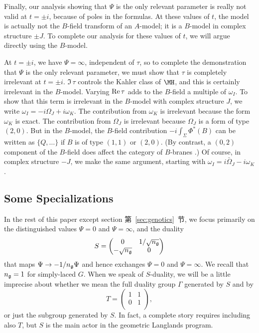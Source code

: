 Finally, our analysis showing that $\Psi$ is the only relevant
parameter is really not valid at $t=\pm i$, because of poles in
the formulas.  At these values of $t$, the model is actually not
the $B$-field transform of an $A$-model; it is a $B$-model in
complex structure $\pm J$. To complete our analysis for these
values of $t$, we will argue directly using the $B$-model.

At $t=\pm i$, we have $\Psi=\infty$, independent of $\tau$, so to
complete the demonstration that $\Psi$ is the only relevant
parameter, we must show that $\tau$ is completely irrelevant at
$t=\pm i$. ${\Im}\,\tau$ controls the Kahler class of $\MH$, and
this is certainly irrelevant in the $B$-model.  Varying ${\rm
Re}\,\tau$ adds to the $B$-field a multiple of $\omega_I$. To show
that this term is irrelevant in the $B$-model with complex
structure $J$, we write $\omega_I=-i\Omega_J+i\omega_K$. The
contribution from $\omega_K$ is irrelevant because the form
$\omega_K$ is exact. The contribution from $\Omega_J$ is
irrelevant because $\Omega_J$ is a form of type $(2,0)$.  But in
the $B$-model, the $B$-field contribution $-i\int_\Sigma\Phi^*(B)$
can be written as $\{Q,\dots\}$ if $B$ is of type $(1,1)$ or
$(2,0)$.  (By contrast, a $(0,2)$ component of the $B$-field does
affect the category of $B$-branes \cite{ref71}.) Of course, in complex
structure $-J$, we make the same argument, starting with
$\omega_I=i\bar\Omega_J-i\omega_K$.

\subsection{Some Specializations}

\label{sec:somespec}

In the rest of this paper except section 第~\ref{sec:genotics}~节, we focus
primarily on the distinguished values $\Psi=0$ and $\Psi=\infty$,
and the duality %
\setcounter{equation}{34}
\begin{equation}\label{eq:rtu}
S=\left(\begin{matrix}0 & 1/\sqrt {n_{\frak
g}}\\ -\sqrt {n_{\frak g}}& 0\\\end{matrix}\right)
\end{equation}
 that maps $\Psi\to
-1/n_{\frak g}\Psi$ and hence exchanges $\Psi=0$ and
$\Psi=\infty$. We recall that $n_{\frak g}=1$ for simply-laced
$G$. When we speak of $S$-duality, we will be a little imprecise
about whether we mean the full duality group $\Gamma$ generated by
$S$ and by %
\setcounter{equation}{35}
\begin{equation}\label{eq:ntu}
T=\left(\begin{matrix}1 & 1\\ 0& 1\\\end{matrix}\right),
\end{equation}
 or
just the subgroup generated by $S$. In fact,  a complete story
requires including also $T$, but $S$ is the main actor in the
geometric Langlands program.


